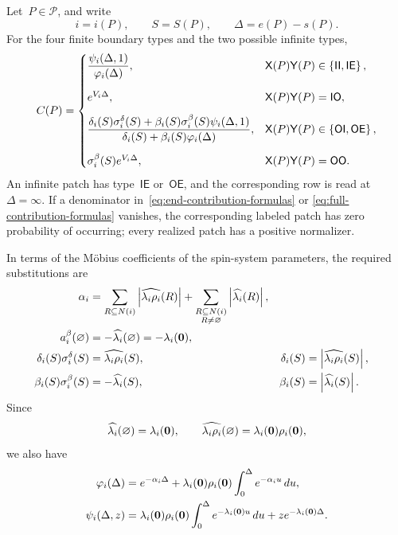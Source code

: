 Let~$P\in\mathcal P$, and write
\begin{equation*}
i=i(P),
\qquad
S=S(P),
\qquad
\Delta=e(P)-s(P).
\end{equation*}
For the four finite boundary types and the two possible infinite types,
\begin{equation}
\label{eq:full-contribution-formulas}
C(P)
=
\begin{cases}
\displaystyle
\frac{\psi_i(\Delta,1)}{\varphi_i(\Delta)},
&\mathsf X(P)\mathsf Y(P)\in\left\{\mathsf{II},\mathsf{IE}\right\},
\\[1.4em]
e^{V_i\Delta},
&\mathsf X(P)\mathsf Y(P)=\mathsf{IO},
\\[0.8em]
\displaystyle
\frac{
\delta_i(S)\sigma_i^\delta(S)
+
\beta_i(S)\sigma_i^\beta(S)\psi_i(\Delta,1)
}{
\delta_i(S)+\beta_i(S)\varphi_i(\Delta)
},
&\mathsf X(P)\mathsf Y(P)\in\left\{\mathsf{OI},\mathsf{OE}\right\},
\\[1.4em]
\sigma_i^\beta(S)e^{V_i\Delta},
&\mathsf X(P)\mathsf Y(P)=\mathsf{OO}.
\end{cases}
\end{equation}
An infinite patch has type~$\mathsf{IE}$ or~$\mathsf{OE}$, and the
corresponding row is read at~$\Delta=\infty$. If a denominator
in~\eqref{eq:end-contribution-formulas} or
\eqref{eq:full-contribution-formulas} vanishes, the corresponding labeled patch
has zero probability of occurring; every realized patch has a positive
normalizer.

In terms of the M\"obius coefficients of the spin-system parameters, the
required substitutions are
\begin{equation}
\label{eq:dual-to-spin-contribution-data}
\begin{aligned}
\alpha_i
&=
\sum_{R\subseteq N(i)}\left|\widehat{\lambda_i\rho_i}(R)\right|
+
\sum_{\substack{R\subseteq N(i)\\R\neq\varnothing}}
\left|\widehat{\lambda_i}(R)\right|,
\\
a_i^\beta(\varnothing)
&=
-\widehat{\lambda_i}(\varnothing)
=
-\lambda_i(\mathbf{0}),
\\
\delta_i(S)\sigma_i^\delta(S)
&=
\widehat{\lambda_i\rho_i}(S),
&\delta_i(S)
&=
\left|\widehat{\lambda_i\rho_i}(S)\right|,
\\
\beta_i(S)\sigma_i^\beta(S)
&=
-\widehat{\lambda_i}(S),
&\beta_i(S)
&=
\left|\widehat{\lambda_i}(S)\right|.
\end{aligned}
\end{equation}
Since
\begin{equation*}
\widehat{\lambda_i}(\varnothing)=\lambda_i(\mathbf{0}),
\qquad
\widehat{\lambda_i\rho_i}(\varnothing)
=
\lambda_i(\mathbf{0})\rho_i(\mathbf{0}),
\end{equation*}
we also have
\begin{align*}
\varphi_i(\Delta)
&=
e^{-\alpha_i\Delta}
+
\lambda_i(\mathbf{0})\rho_i(\mathbf{0})
\int_0^\Delta e^{-\alpha_i u}\,du,
\\
\psi_i(\Delta,z)
&=
\lambda_i(\mathbf{0})\rho_i(\mathbf{0})
\int_0^\Delta e^{-\lambda_i(\mathbf{0})u}\,du
+
z e^{-\lambda_i(\mathbf{0})\Delta}.
\end{align*}

